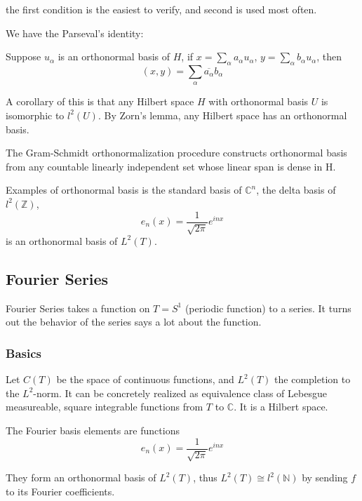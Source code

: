 \documentclass[main.tex]{subfiles}
\begin{document}
\begin{theorem}[Projection]
\begin{remark}
the first condition is the easiest to verify, and second is used most often. 
\end{remark}

We have the Parseval's identity:
\begin{theorem}
Suppose $u_\alpha$ is an orthonormal basis of $H$, if $x = \sum_\alpha a_\alpha u_\alpha$, $y = \sum_\alpha b_\alpha u_\alpha$, then 
$$
(x,y) = \sum_\alpha \overline{a_\alpha} b_{\alpha}
$$
\end{theorem}

A corollary of this is that any Hilbert space $H$ with orthonormal basis $U$  is isomorphic to $l^2(U)$. By Zorn's lemma, any Hilbert space has an orthonormal basis.

The Gram-Schmidt orthonormalization procedure constructs orthonormal basis from any countable linearly independent set whose linear span is dense in H.


Examples of orthonormal basis is the standard basis of $\mathbb{C}^n$, the delta basis of $l^2(\mathbb{Z})$, 
$$
e_n(x) = \frac{1}{\sqrt{2\pi}} e^{inx}
$$
is an orthonormal basis of $L^2(T)$. 


\end{theorem}

\subsection{Fourier Series}
Fourier Series takes a function on $T = S^1$ (periodic function) to a series. It turns out the behavior of the series says a lot about the function.

\subsubsection{Basics}
Let $C(T)$ be the space of continuous functions, and $L^2(T)$ the completion to the $L^2$-norm.
It can be concretely realized as equivalence class of Lebesgue measureable, square integrable functions from $T$ to $\mathbb{C}$. It is a Hilbert space. 

The Fourier basis elements are functions
$$
e_n(x) = \frac{1}{\sqrt{2 \pi}} e^{inx}
$$

\begin{theorem}
They form an orthonormal basis of $L^2(T)$, thus $L^2(T) \cong l^2(\mathbb{N})$ by sending $f$ to its Fourier coefficients.
\end{theorem}
\end{document}
